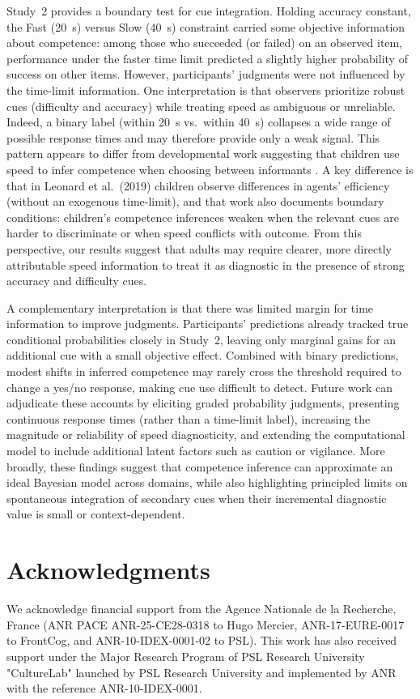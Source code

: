 \documentclass[10pt,letterpaper]{article}
\begin{document}
Study~2 provides a boundary test for cue integration. Holding accuracy constant, the Fast (20~s) versus Slow (40~s) constraint carried some objective information about competence: among those who succeeded (or failed) on an observed item, performance under the faster time limit predicted a slightly higher probability of success on other items. However, participants’ judgments were not influenced by the time-limit information. One interpretation is that observers prioritize robust cues (difficulty and accuracy) while treating speed as ambiguous or unreliable. Indeed, a binary label (within 20~s vs.\ within 40~s) collapses a wide range of possible response times and may therefore provide only a weak signal. This pattern appears to differ from developmental work suggesting that children use speed to infer competence when choosing between informants \citep{Leonard-2019}. A key difference is that in Leonard et al.\ (2019) children observe differences in agents' efficiency (without an exogenous time-limit), and that work also documents boundary conditions: children’s competence inferences weaken when the relevant cues are harder to discriminate or when speed conflicts with outcome. From this perspective, our results suggest that adults may require clearer, more directly attributable speed information to treat it as diagnostic in the presence of strong accuracy and difficulty cues.

A complementary interpretation is that there was limited margin for time information to improve judgments. Participants’ predictions already tracked true conditional probabilities closely in Study~2, leaving only marginal gains for an additional cue with a small objective effect. Combined with binary predictions, modest shifts in inferred competence may rarely cross the threshold required to change a yes/no response, making cue use difficult to detect. Future work can adjudicate these accounts by eliciting graded probability judgments, presenting continuous response times (rather than a time-limit label), increasing the magnitude or reliability of speed diagnosticity, and extending the computational model to include additional latent factors such as caution or vigilance. More broadly, these findings suggest that competence inference can approximate an ideal Bayesian model across domains, while also highlighting principled limits on spontaneous integration of secondary cues when their incremental diagnostic value is small or context-dependent.

\section{Acknowledgments}

We acknowledge financial support from the Agence Nationale de la Recherche, France (ANR PACE
ANR-25-CE28-0318 to Hugo Mercier, ANR-17-EURE-0017 to FrontCog, and ANR-10-IDEX-0001-02 to PSL). This work has also received support under the Major Research Program of PSL Research University "CultureLab" launched by PSL Research University and implemented by ANR with the reference ANR-10-IDEX-0001.

\printbibliography
\end{document}
